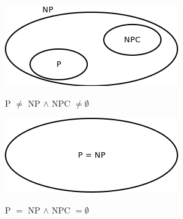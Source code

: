 \begin{figure}[tbh]
\centering
\begin{multicols}{2}
\includegraphics[width=0.75\hsize]{definitions/P_neq_NP.png}
\caption{P $\neq$ NP $\land$ NPC $\neq\emptyset$}
\label{P_neq_NP}
\columnbreak
\includegraphics[width=0.75\hsize]{definitions/P_eq_NP.png}
\caption{P $=$ NP $\land$ NPC $=\emptyset$}
\label{P_eq_NP}
\end{multicols}
\end{figure}

